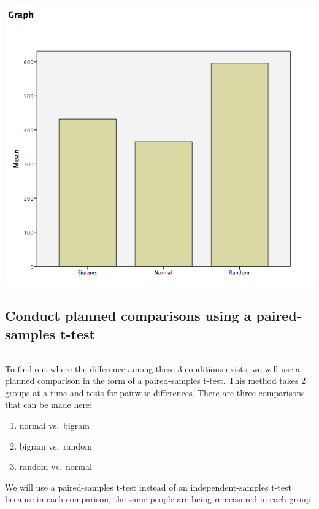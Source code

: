 \documentclass[
]{book}
\providecommand{\tightlist}{%
  \setlength{\itemsep}{0pt}\setlength{\parskip}{0pt}}
\begin{document}
\includegraphics{img/9.4.30.png}

\hypertarget{conduct-planned-comparisons-using-a-paired-samples-t-test}{%
\subsection{Conduct planned comparisons using a paired-samples t-test}\label{conduct-planned-comparisons-using-a-paired-samples-t-test}}

\begin{center}\rule{0.5\linewidth}{0.5pt}\end{center}

To find out where the difference among these 3 conditions exists, we will use a planned comparison in the form of a paired-samples t-test. This method takes 2 groups at a time and tests for pairwise differences. There are three comparisons that can be made here:

\begin{enumerate}
\def\labelenumi{\arabic{enumi}.}
\tightlist
\item
  normal vs.~bigram
\item
  bigram vs.~random
\item
  random vs.~normal
\end{enumerate}

We will use a paired-samples t-test instead of an independent-samples t-test because in each comparison, the same people are being remeasured in each group.
\end{document}
